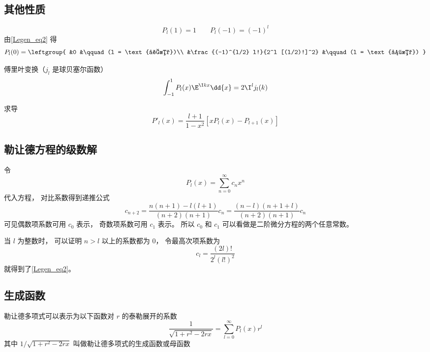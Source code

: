 \subsection{其他性质}
\begin{equation}
P_l(1) = 1 \qquad P_l(-1) = (-1)^l
\end{equation}
由\autoref{Legen_eq2} 得
\begin{equation}\label{Legen_eq5}
P_l(0) = \leftgroup{
&0 &\qquad (l = \text{奇数})\\
&\frac{(-1)^{l/2} l!}{2^l [(l/2)!]^2} &\qquad (l = \text{偶数})
}\end{equation}

傅里叶变换（$j_l$ 是球贝塞尔函数）
\begin{equation}\label{Legen_eq3}
\int_{-1}^1 P_l(x) \E^{\I k x} \dd{x} = 2 \I^l j_l(k)
\end{equation}

求导
\begin{equation}\label{Legen_eq6}
P'_l(x) = \frac{l+1}{1-x^2} [xP_l(x) - P_{l+1}(x)]
\end{equation}

\subsection{勒让德方程的级数解}
令
\begin{equation}
P_l(x) = \sum_{n = 0}^\infty c_n x^n
\end{equation}
代入方程， 对比系数得到递推公式
\begin{equation}
c_{n+2} = \frac{n(n+1)-l(l+1)}{(n+2)(n+1)}c_n = \frac{(n-l)(n+1+l)}{(n+2)(n+1)}c_n
\end{equation}
可见偶数项系数可用 $c_0$ 表示， 奇数项系数可用 $c_1$ 表示。 所以 $c_0$ 和 $c_1$ 可以看做是二阶微分方程的两个任意常数。

当 $l$ 为整数时， 可以证明 $n > l$ 以上的系数都为 0， 令最高次项系数为
\begin{equation}
c_l = \frac{(2l)!}{2^l (l!)^2}
\end{equation}
就得到了\autoref{Legen_eq2}。

\subsection{生成函数}
勒让德多项式可以表示为以下函数对 $r$ 的泰勒展开的系数
\begin{equation}
\frac{1}{\sqrt{1 + r^2 - 2rx}} = \sum_{l = 0}^\infty P_l(x) r^l
\end{equation}
其中 $1/\sqrt {1+ r^2 - 2rx}$ 叫做勒让德多项式的生成函数或母函数